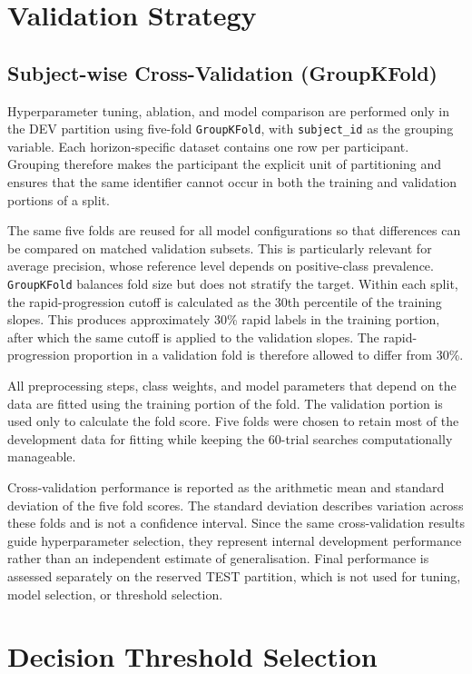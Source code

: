 \section{Validation Strategy}
\label{sec:methods_validation}
\subsection{Subject-wise Cross-Validation (GroupKFold)}
\label{sec:methods_groupkfold}
Hyperparameter tuning, ablation, and model comparison are performed only in the \gls{DEV} partition using five-fold \texttt{GroupKFold}, with \texttt{subject\_id} as the grouping variable. Each horizon-specific dataset contains one row per participant. Grouping therefore makes the participant the explicit unit of partitioning and ensures that the same identifier cannot occur in both the training and validation portions of a split.

The same five folds are reused for all model configurations so that differences can be compared on matched validation subsets. This is particularly relevant for average precision, whose reference level depends on positive-class prevalence. \texttt{GroupKFold} balances fold size but does not stratify the target. Within each split, the rapid-progression cutoff is calculated as the 30th percentile of the training slopes. This produces approximately 30\% rapid labels in the training portion, after which the same cutoff is applied to the validation slopes. The rapid-progression proportion in a validation fold is therefore allowed to differ from 30\%.

All preprocessing steps, class weights, and model parameters that depend on the data are fitted using the training portion of the fold. The validation portion is used only to calculate the fold score. Five folds were chosen to retain most of the development data for fitting while keeping the 60-trial searches computationally manageable.

Cross-validation performance is reported as the arithmetic mean and standard deviation of the five fold scores. The standard deviation describes variation across these folds and is not a confidence interval. Since the same cross-validation results guide hyperparameter selection, they represent internal development performance rather than an independent estimate of generalisation. Final performance is assessed separately on the reserved \gls{TEST} partition, which is not used for tuning, model selection, or threshold selection.

\section{Decision Threshold Selection}
\label{sec:methods_threshold}

